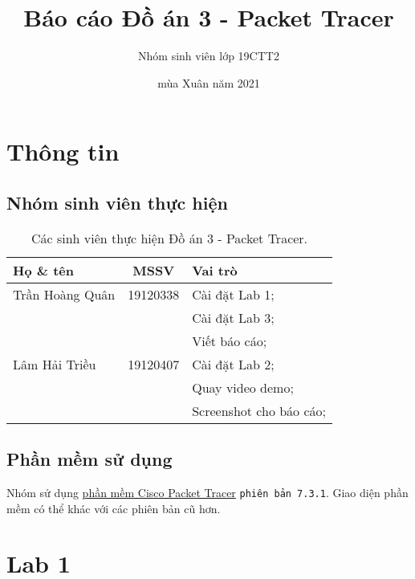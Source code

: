 \documentclass[]{article}
\title{\textbf{Báo cáo Đồ án 3 - Packet Tracer}}
\author{Nhóm sinh viên lớp 19CTT2}
\date{mùa Xuân năm 2021}
\begin{document}
\maketitle
\tableofcontents
\listoftables
\pagebreak

\section{Thông tin}
\subsection{Nhóm sinh viên thực hiện}
\begin{table}[ht]
    \centering
    \caption{Các sinh viên thực hiện Đồ án 3 - Packet Tracer.}
    \begin{tabular}[t]{lcl}
        \toprule
        Họ \& tên&MSSV&Vai trò\\
        \midrule
        Trần Hoàng Quân&19120338&Cài đặt Lab 1;\\
        &&Cài đặt Lab 3;\\
        &&Viết báo cáo;\\
        Lâm Hải Triều&19120407&Cài đặt Lab 2;\\
        &&Quay video demo;\\
        &&Screenshot cho báo cáo;\\
        \bottomrule
    \end{tabular}
\end{table}

\subsection{Phần mềm sử dụng}
Nhóm sử dụng \href{https://www.netacad.com/courses/packet-tracer}{phần mềm Cisco Packet Tracer} \texttt{phiên bản 7.3.1}. Giao diện phần mềm có thể khác với các phiên bản cũ hơn.

\section{Lab 1}
\end{document}
